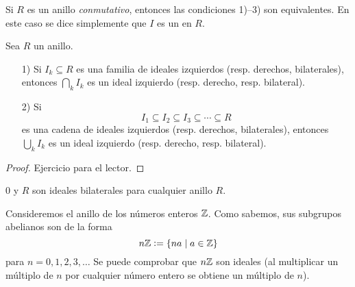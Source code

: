 \begin{comentario}
  Si $R$ es un anillo \emph{conmutativo}, entonces las condiciones 1)--3)
  son equivalentes. En este caso se dice simplemente que $I$ es un 
  en $R$.
\end{comentario}

\begin{observacion}
  Sea $R$ un anillo.

  \begin{enumerate}
  \item[1)] Si $I_k \subseteq R$ es una familia de ideales izquierdos
    (resp. derechos, bilaterales), entonces $\bigcap_k I_k$ es un ideal
    izquierdo (resp. derecho, resp. bilateral).

  \item[2)] Si
    $$I_1 \subseteq I_2 \subseteq I_3 \subseteq \cdots \subseteq R$$
    es una cadena de ideales izquierdos (resp. derechos, bilaterales), entonces
    $\bigcup_k I_k$ es un ideal izquierdo (resp. derecho, resp. bilateral).
  \end{enumerate}

  \begin{proof}
    Ejercicio para el lector.
  \end{proof}
\end{observacion}

\begin{ejemplo}
  $0$ y $R$ son ideales bilaterales para cualquier anillo $R$.
\end{ejemplo}

\begin{ejemplo}
  Consideremos el anillo de los números enteros $\mathbb{Z}$. Como sabemos,
  sus subgrupos abelianos son de la forma
  $$n\mathbb{Z} \mathrel{\mathop:}= \{ na \mid a\in \mathbb{Z} \}$$
  para $n = 0,1,2,3,\ldots$ Se puede comprobar que $n\mathbb{Z}$ son ideales
  (al multiplicar un múltiplo de $n$ por cualquier número entero se obtiene
  un múltiplo de $n$).
\end{ejemplo}


